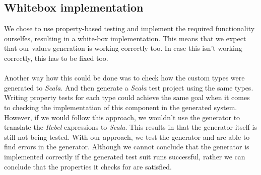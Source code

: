 \subsection*{Whitebox implementation}
We chose to use property-based testing and implement the required functionality ourselfes, resulting in a white-box implementation. This means that we expect that our values generation is working correctly too. In case this isn't working correctly, this has to be fixed too.\\
\\
Another way how this could be done was to check how the custom types were generated to \textit{Scala}. And then generate a \textit{Scala} test project using the same types. Writing property tests for each type could achieve the same goal when it comes to checking the implementation of this component in the generated system. However, if we would follow this approach, we wouldn't use the generator to translate the \textit{Rebel} expressions to \textit{Scala}. This results in that the generator itself is still not being tested. With our approach, we test the generator and are able to find errors in the generator. Although we cannot conclude that the generator is implemented correctly if the generated test suit runs successful, rather we can conclude that the properties it checks for are satisfied.
